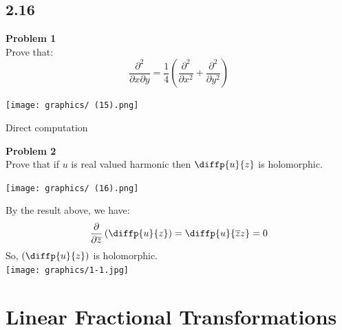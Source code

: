 \documentclass[12pt,oneside]{book}
\begin{document}
\section{2.16}
\begin{tcolorbox}[colback=blue!15]
    \textbf{Problem 1}\\
    Prove that:
    $$\frac{\partial^2}{\partial x\partial y}=\frac{1}{4}\left(\frac{\partial^2}{\partial x^2}+\frac{\partial^2}{\partial y^2}\right)$$
\end{tcolorbox}
\begin{marginfigure}%
    \texttt{[image: graphics/ (15).png]}
\end{marginfigure}
Direct computation
\begin{tcolorbox}[colback=blue!15]
    \textbf{Problem 2}\\
    Prove that if $u$ is real valued harmonic then $\diffp{u}{z}$ is holomorphic.
\end{tcolorbox}
\begin{marginfigure}%
    \texttt{[image: graphics/ (16).png]}
\end{marginfigure}%
By the result above, we have:
$$\frac{\partial}{\partial\overline{z}}\left(\diffp{u}{z}\right)=\diffp{{u}}{{\overline{z}}{z}}=0$$
So, $\left(\diffp{u}{z}\right)$ is holomorphic.\\
\texttt{[image: graphics/1-1.jpg]}





\chapter{Linear Fractional Transformations}
\end{document}
